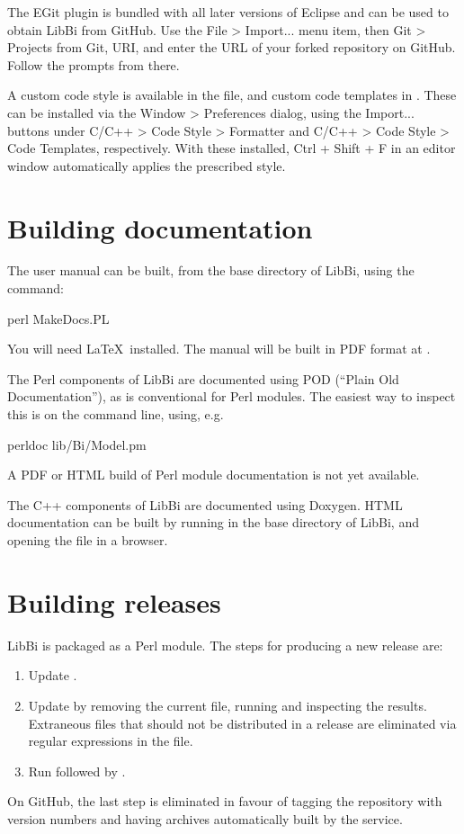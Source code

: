 The EGit plugin is bundled with all later versions of Eclipse and can be used
to obtain LibBi from GitHub. Use the \textsf{File > Import...} menu item, then
\textsf{Git > Projects from Git}, \textsf{URI}, and enter the URL of your
forked repository on GitHub. Follow the prompts from there.

 A custom code style is available
in the  file, and custom code templates
in . These can be installed via the
\textsf{Window > Preferences} dialog, using the \textsf{Import...} buttons
under \textsf{C/C++ > Code Style > Formatter} and \textsf{C/C++ > Code Style >
  Code Templates}, respectively. With these installed, \textsf{Ctrl + Shift +
  F} in an editor window automatically applies the prescribed style.

\section{Building documentation}

The user manual can be built, from the base directory of LibBi, using the
command:
\begin{cmdcode}
perl MakeDocs.PL
\end{cmdcode}
You will need \LaTeX\ installed. The manual will be built in PDF format at
.

The Perl components of LibBi are documented using POD (``Plain Old
Documentation''), as is conventional for Perl modules. The easiest way to
inspect this is on the command line, using, e.g.
\begin{cmdcode}
perldoc lib/Bi/Model.pm
\end{cmdcode}
A PDF or HTML build of Perl module documentation is not yet available.

The C++ components of LibBi are documented using Doxygen. HTML documentation
can be built by running  in the base directory of LibBi, and
opening the  file in a browser.

\section{Building releases}

LibBi is packaged as a Perl module. The steps for producing a new release are:
\begin{enumerate}
\item Update .
\item Update  by removing the current file, running  and inspecting the results. Extraneous files that should
  not be distributed in a release are eliminated via regular expressions in
  the  file.
\item Run  followed by .
\end{enumerate}
On GitHub, the last step is eliminated in favour of tagging the repository
with version numbers and having archives automatically built by the service.

